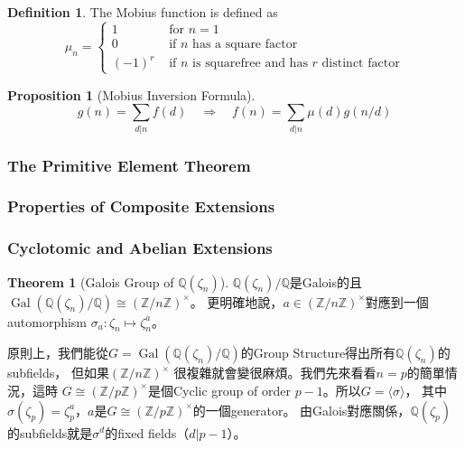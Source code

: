 \documentclass[12pt]{article}
\theoremstyle{definition}
\newtheorem{thm}{Theorem}
\newtheorem{dfn}{Definition}
\newtheorem{prop}{Proposition}
\newcommand{\FF}{\mathbb F}
\newcommand{\QQ}{\mathbb Q}
\newcommand{\ZZ}{\mathbb Z}
\DeclareMathOperator{\Gal}{Gal}
\begin{document}


\begin{dfn}
	The Mobius function is defined as \[\mu_n=\begin{cases}
			1      & \text{ for } n=1                                         \\
			0      & \text{ if $n$ has a square factor}                       \\
			(-1)^r & \text{ if $n$ is squarefree and has $r$ distinct factor}
		\end{cases}\]
\end{dfn}

\begin{prop}[Mobius Inversion Formula]
	\[
		g(n)=\sum_{d|n}f(d)
		\quad\Rightarrow\quad
		f(n)=\sum_{d|n}\mu(d)g(n/d)
	\]
\end{prop}

\subsubsection{The Primitive Element Theorem}
\subsubsection{Properties of Composite Extensions}

\subsubsection{Cyclotomic and Abelian Extensions}

\begin{thm}[Galois Group of $\QQ(\zeta_n)$]
	$\QQ(\zeta_n)/\QQ$是Galois的且$\Gal(\QQ(\zeta_n)/\QQ)\cong (\ZZ/n\ZZ)^\times$。
	更明確地說，$a\in (\ZZ/n\ZZ)^\times $對應到一個automorphism $\sigma_a: \zeta_n\mapsto \zeta_n^a$。
\end{thm}

原則上，我們能從$G=\Gal(\QQ(\zeta_n)/\QQ)$的Group Structure得出所有$\QQ(\zeta_n)$的subfields，
但如果$(\ZZ/n\ZZ)^\times$ 很複雜就會變很麻煩。我們先來看看$n=p$的簡單情況，這時
$G\cong (\ZZ/p\ZZ)^\times$是個Cyclic group of order $p-1$。所以$G=\langle \sigma \rangle$，
其中$\sigma(\zeta_p)=\zeta_p^a$，$a$是$G\cong (\ZZ/p\ZZ)^\times$的一個generator。
由Galois對應關係，$\QQ(\zeta_p)$的subfields就是$\sigma^d$的fixed fields（$d|p-1$）。
\end{document}
